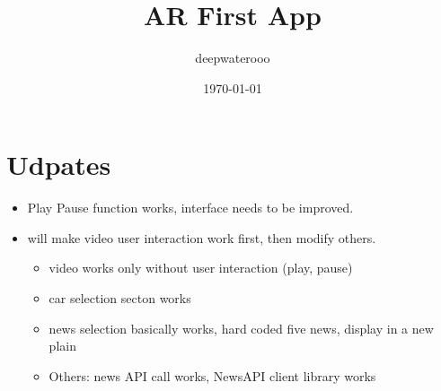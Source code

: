 \documentclass[9pt, b5paper]{article}
\author{deepwaterooo}
\date{\today}
\title{AR First App}
\begin{document}
\maketitle
\tableofcontents


\section{Udpates}
\label{sec-1}
\begin{itemize}
\item Play Pause function works, interface needs to be improved.
\item will make video user interaction work first, then modify others. 
\begin{itemize}
\item video works only without user interaction (play, pause)
\item car selection secton works
\item news selection basically works, hard coded five news, display in a new plain
\item Others: news API call works, NewsAPI client library works
\end{itemize}
\end{itemize}
\end{document}
